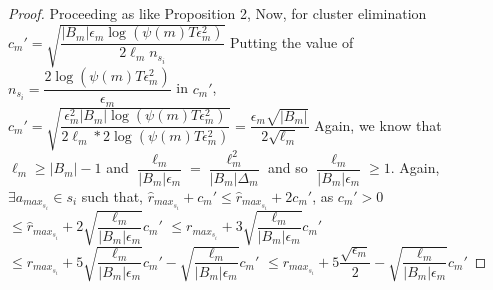 \begin{proof}
\newline
Proceeding as like Proposition 2,
\newline
\newline Now, for cluster elimination $c_{m}'=\sqrt{\dfrac{|B_{m}|\epsilon_{m}\log (\psi(m)T\epsilon_{m}^{2})}{2\ell_{m} n_{s_{i}}}}$
\newline Putting the value of $n_{s_{i}}=\dfrac{2\log{(\psi(m)T\epsilon_{m}^{2})}}{\epsilon_{m}}$ in $c_{m}'$,
\newline $c_{m}'=\sqrt{\dfrac{\epsilon_{m}^{2}|B_{m}|\log (\psi(m)T\epsilon_{m}^{2})}{2\ell_{m}*2 \log(\psi(m)T\epsilon_{m}^{2})}}=\dfrac{\epsilon_{m}\sqrt{|B_{m}|}}{2\sqrt{\ell_{m}}}$
\newline Again, we know that $\ell_{m}\geq |B_{m}|-1$ and $\dfrac{\ell_{m}}{|B_{m}|\epsilon_{m}}=\dfrac{\ell_{m}^{2}}{|B_{m}|\Delta_{m}}$ and so $\dfrac{\ell_{m}}{|B_{m}|\epsilon_{m}}\geq 1$.
\newline Again, $\exists a_{max_{s_{i}}} \in s_{i}$ such that, 
$\hat{r}_{max_{s_{i}}} + c_{m}'\leq \hat{r}_{max_{s_{i}}} + 2c_{m}'$, as $c_{m}' > 0$
\newline\hspace*{14em}$\leq\hat{r}_{max_{s_{i}}} + 2\sqrt{\dfrac{\ell_{m}}{|B_{m}|\epsilon_{m}}}c_{m}' $
\newline\hspace*{14em}$\leq r_{max_{s_{i}}} + 3\sqrt{\dfrac{\ell_{m}}{|B_{m}|\epsilon_{m}}}c_{m}'$
\newline\hspace*{14em}$\leq r_{max_{s_{i}}} + 5\sqrt{\dfrac{\ell_{m}}{|B_{m}|\epsilon_{m}}}c_{m}'-\sqrt{\dfrac{\ell_{m}}{|B_{m}|\epsilon_{m}}}c_{m}'$
\newline\hspace*{14em}$\leq r_{max_{s_{i}}} + 5\dfrac{\sqrt{\epsilon_{m}}}{2}-\sqrt{\dfrac{\ell_{m}}{|B_{m}|\epsilon_{m}}}c_{m}'$

\end{proof}

